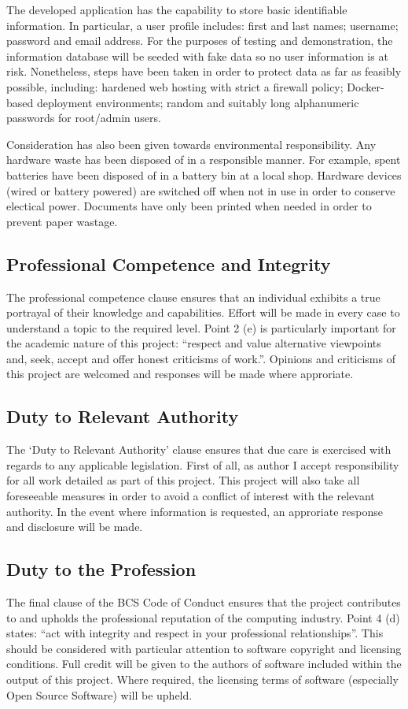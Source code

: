       The developed application has the capability to store basic identifiable information. In particular, a user profile includes: first and last names; username; password and email address. For the purposes of testing and demonstration, the information database will be seeded with fake data so no user information is at risk. Nonetheless, steps have been taken in order to protect data as far as feasibly possible, including: hardened web hosting with strict a firewall policy; Docker-based deployment environments; random and suitably long alphanumeric passwords for root/admin users.

      Consideration has also been given towards environmental responsibility. Any hardware waste has been disposed of in a responsible manner. For example, spent batteries have been disposed of in a battery bin at a local shop. Hardware devices (wired or battery powered) are switched off when not in use in order to conserve electical power. Documents have only been printed when needed in order to prevent paper wastage. 

    \subsection{Professional Competence and Integrity}
      The professional competence clause ensures that an individual exhibits a true portrayal of their knowledge and capabilities. Effort will be made in every case to understand a topic to the required level. Point 2 (e) is particularly important for the academic nature of this project: ``respect and value alternative viewpoints and, seek, accept and offer honest criticisms of work.''. Opinions and criticisms of this project are welcomed and responses will be made where approriate. 

    \subsection{Duty to Relevant Authority}
      The `Duty to Relevant Authority' clause ensures that due care is exercised with regards to any applicable legislation. First of all, as author I accept responsibility for all work detailed as part of this project. This project will also take all foreseeable measures in order to avoid a conflict of interest with the relevant authority. In the event where information is requested, an approriate response and disclosure will be made.

    \subsection{Duty to the Profession}
      The final clause of the BCS Code of Conduct ensures that the project contributes to and upholds the professional reputation of the computing industry. Point 4 (d) states: ``act with integrity and respect in your professional relationships''. This should be considered with particular attention to software copyright and licensing conditions. Full credit will be given to the authors of software included within the output of this project. Where required, the licensing terms of software (especially Open Source Software) will be upheld.

